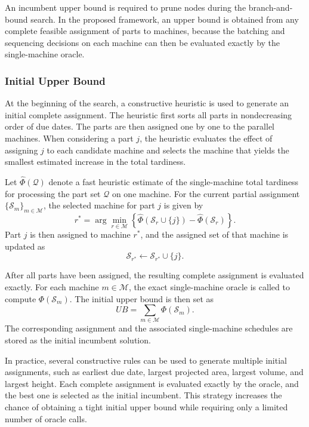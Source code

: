 \documentclass[letterpaper, 10 pt, conference]{ieeeconf}  %
\begin{document}
An incumbent upper bound is required to prune nodes during the
branch-and-bound search. In the proposed framework, an upper bound is
obtained from any complete feasible assignment of parts to machines, because
the batching and sequencing decisions on each machine can then be evaluated
exactly by the single-machine oracle.

\subsubsection{Initial Upper Bound}

At the beginning of the search, a constructive heuristic is used to generate
an initial complete assignment. The heuristic first sorts all parts in
nondecreasing order of due dates. The parts are then assigned one by one to
the parallel machines. When considering a part $j$, the heuristic evaluates
the effect of assigning $j$ to each candidate machine and selects the
machine that yields the smallest estimated increase in the total tardiness.

Let $\widehat{\Phi}(\mathcal{Q})$ denote a fast heuristic estimate of the
single-machine total tardiness for processing the part set
$\mathcal{Q}$ on one machine. For the current partial assignment
$\{\mathcal{S}_m\}_{m\in\mathcal{M}}$, the selected machine for part $j$ is
given by
\[
r^*
=
\arg\min_{r\in\mathcal{M}}
\left\{
\widehat{\Phi}(\mathcal{S}_r\cup\{j\})
-
\widehat{\Phi}(\mathcal{S}_r)
\right\}.
\]
Part $j$ is then assigned to machine $r^*$, and the assigned set of that
machine is updated as
\[
\mathcal{S}_{r^*}\leftarrow \mathcal{S}_{r^*}\cup\{j\}.
\]

After all parts have been assigned, the resulting complete assignment is
evaluated exactly. For each machine $m\in\mathcal{M}$, the exact
single-machine oracle is called to compute
$\Phi(\mathcal{S}_m)$. The initial upper bound is then set as
\[
UB
=
\sum_{m\in\mathcal{M}}
\Phi(\mathcal{S}_m).
\]
The corresponding assignment and the associated single-machine schedules
are stored as the initial incumbent solution.

In practice, several constructive rules can be used to generate multiple
initial assignments, such as earliest due date, largest projected area,
largest volume, and largest height. Each complete assignment is evaluated
exactly by the oracle, and the best one is selected as the initial
incumbent. This strategy increases the chance of obtaining a tight initial
upper bound while requiring only a limited number of oracle calls.
\end{document}
